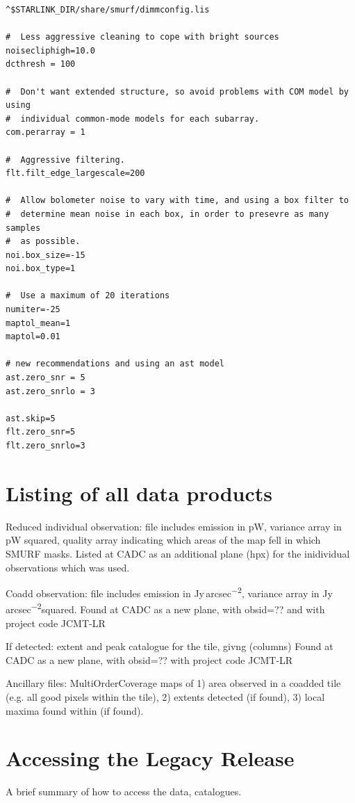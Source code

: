 \documentclass[twocolumn]{aastex6}
\newcommand{\jyas}{Jy\,arcsec\textsuperscript{$-$2}}
\begin{document}
\begin{verbatim}
^$STARLINK_DIR/share/smurf/dimmconfig.lis

#  Less aggressive cleaning to cope with bright sources
noisecliphigh=10.0
dcthresh = 100

#  Don't want extended structure, so avoid problems with COM model by using
#  individual common-mode models for each subarray.
com.perarray = 1

#  Aggressive filtering.
flt.filt_edge_largescale=200

#  Allow bolometer noise to vary with time, and using a box filter to
#  determine mean noise in each box, in order to presevre as many samples
#  as possible.
noi.box_size=-15
noi.box_type=1

#  Use a maximum of 20 iterations
numiter=-25
maptol_mean=1
maptol=0.01

# new recommendations and using an ast model
ast.zero_snr = 5
ast.zero_snrlo = 3

ast.skip=5
flt.zero_snr=5
flt.zero_snrlo=3
\end{verbatim}

\section{Listing of all data products}

Reduced individual observation: file includes emission in pW, variance
array in pW squared, quality array indicating which areas of the map fell
in which SMURF masks.  Listed at CADC as an additional plane (hpx) for
the inidividual observations which was used.

Coadd observation: file includes emission in \jyas, variance array in \jyas squared.
Found at CADC as a new plane, with obsid=?? and with project code JCMT-LR

If detected: extent and peak catalogue for the tile, givng (columns) 
Found at CADC as a new plane, with obsid=?? with project code JCMT-LR

Ancillary files: MultiOrderCoverage maps of 1) area observed in a
coadded tile (e.g. all good pixels within the tile), 2) extents
detected (if found), 3) local maxima found within (if found).





\section{Accessing the Legacy Release}
A brief summary of how to access the data, catalogues.
\end{document}
